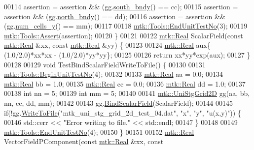 \begin{DoxyCode}
00114   assertion = assertion && (gg.\hyperlink{classmtk_1_1UniStgGrid2D_a1442eaf219f099d0ebf46a170fdebf92}{south\_bndy}() == cc);
00115   assertion = assertion && (gg.\hyperlink{classmtk_1_1UniStgGrid2D_afe1ead253cdeb5503e0489eba8fd84e2}{north\_bndy}() == dd);
00116   assertion = assertion && (gg.\hyperlink{classmtk_1_1UniStgGrid2D_aed05a801cc9a76dba0ff203cea58a61a}{num\_cells\_y}() == mm);
00117 
00118   \hyperlink{classmtk_1_1Tools_aba67d9dc35c9c1c49430fcc9ea035e03}{mtk::Tools::EndUnitTestNo}(3);
00119   \hyperlink{classmtk_1_1Tools_ac6804df469c94ab6a796fb64f1e44a89}{mtk::Tools::Assert}(assertion);
00120 \}
00121 
00122 \hyperlink{group__c01-roots_gac080bbbf5cbb5502c9f00405f894857d}{mtk::Real} ScalarField(\textcolor{keyword}{const} \hyperlink{group__c01-roots_gac080bbbf5cbb5502c9f00405f894857d}{mtk::Real} &xx, \textcolor{keyword}{const} \hyperlink{group__c01-roots_gac080bbbf5cbb5502c9f00405f894857d}{mtk::Real} &yy) \{
00123 
00124   \hyperlink{group__c01-roots_gac080bbbf5cbb5502c9f00405f894857d}{mtk::Real} aux\{-(1.0/2.0)*xx*xx - (1.0/2.0)*yy*yy\};
00125 
00126   \textcolor{keywordflow}{return} xx*yy*exp(aux);
00127 \}
00128 
00129 \textcolor{keywordtype}{void} TestBindScalarFieldWriteToFile() \{
00130 
00131   \hyperlink{classmtk_1_1Tools_afc29ecaf337a13ed2e817d3890a5a441}{mtk::Tools::BeginUnitTestNo}(4);
00132 
00133   \hyperlink{group__c01-roots_gac080bbbf5cbb5502c9f00405f894857d}{mtk::Real} aa = 0.0;
00134   \hyperlink{group__c01-roots_gac080bbbf5cbb5502c9f00405f894857d}{mtk::Real} bb = 1.0;
00135   \hyperlink{group__c01-roots_gac080bbbf5cbb5502c9f00405f894857d}{mtk::Real} cc = 0.0;
00136   \hyperlink{group__c01-roots_gac080bbbf5cbb5502c9f00405f894857d}{mtk::Real} dd = 1.0;
00137 
00138   \textcolor{keywordtype}{int} nn = 5;
00139   \textcolor{keywordtype}{int} mm = 5;
00140 
00141   \hyperlink{classmtk_1_1UniStgGrid2D}{mtk::UniStgGrid2D} gg(aa, bb, nn, cc, dd, mm);
00142 
00143   gg.\hyperlink{classmtk_1_1UniStgGrid2D_a5f9910ffb94e0314b16c026c4b5762ee}{BindScalarField}(ScalarField);
00144 
00145   \textcolor{keywordflow}{if}(!gg.\hyperlink{classmtk_1_1UniStgGrid2D_a1787a79e4bcee6b89c681dc7e5e2d7bc}{WriteToFile}(\textcolor{stringliteral}{"mtk\_uni\_stg\_grid\_2d\_test\_04.dat"}, \textcolor{stringliteral}{"x"}, \textcolor{stringliteral}{"y"}, \textcolor{stringliteral}{"u(x,y)"})) \{
00146     std::cerr << \textcolor{stringliteral}{"Error writing to file."} << std::endl;
00147   \}
00148 
00149   \hyperlink{classmtk_1_1Tools_aba67d9dc35c9c1c49430fcc9ea035e03}{mtk::Tools::EndUnitTestNo}(4);
00150 \}
00151 
00152 \hyperlink{group__c01-roots_gac080bbbf5cbb5502c9f00405f894857d}{mtk::Real} VectorFieldPComponent(\textcolor{keyword}{const} \hyperlink{group__c01-roots_gac080bbbf5cbb5502c9f00405f894857d}{mtk::Real} &xx, \textcolor{keyword}{const} 

\end{DoxyCode}
